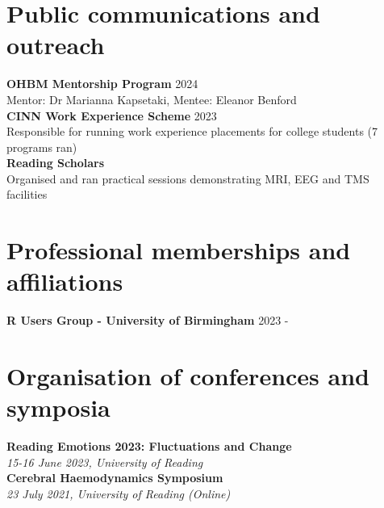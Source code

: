 \documentclass[a4paper,10pt]{article}
\begin{document}
\section{Public communications and outreach}
\vspace{2pt}
\textbf{OHBM Mentorship Program}  \hfill 2024 \\
Mentor: Dr Marianna Kapsetaki, Mentee: Eleanor Benford \\
\vspace{8pt}
\textbf{CINN Work Experience Scheme}  \hfill 2023 \\
Responsible for running work experience placements for college students (7 programs ran) \\
\vspace{8pt}
\textbf{Reading Scholars} \\
Organised and ran practical sessions demonstrating MRI, EEG and TMS facilities \\
\vspace{4pt} 

\section{Professional memberships and affiliations}
\vspace{2pt}
\textbf{R Users Group - University of Birmingham}  \hfill 2023 -  \\
\vspace{8pt}

\section{Organisation of conferences and symposia}
\vspace{2pt}
\textbf{Reading Emotions 2023: Fluctuations and Change}  \\
\textit{15-16 June 2023, University of Reading} \\
\vspace{8pt} 
\textbf{Cerebral Haemodynamics Symposium}  \\
\textit{23 July 2021, University of Reading (Online)} \\
\vspace{4pt}

\end{document}
